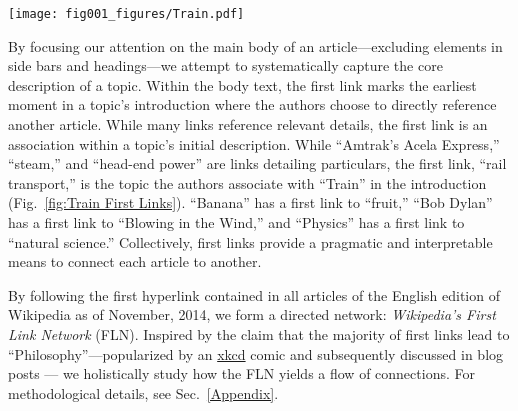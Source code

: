 \documentclass[pre,twocolumn,twoside,superscriptaddress,floatfix]{revtex4-1}
\begin{document}
\begin{figure*}[tp!]
  \texttt{[image: fig001\_figures/Train.pdf]}  
  \caption{
    \textbf{First Link Path For ``Train.''}
    We follow the first link  to another Wikipedia article
    in the main body of the article---the area
    inside the green rectangle, which excludes 
    side bar elements, the navigation bar and title; the first link is circled in red. 
    In this example, the first link to another Wikipedia article is ``Rail Transport.'' 
    We can again select the first link on the ``Rail Transport''
    article, repeating the process to 
    form a path of first links. After 11 links, we arrive at ``Philosophy.''
  }
  \label{fig:Train First Links}
\end{figure*}

By focusing our attention on the main body of an article---excluding
elements in side bars and headings---we 
attempt to systematically capture the core description of a topic.
Within the body text, the first link marks the earliest moment in a topic's introduction where the 
authors choose to directly reference another article. 
While many links reference relevant details, 
the first link is an association within a topic's initial 
description. While 
``Amtrak's Acela Express,'' ``steam,'' and ``head-end power'' 
are links detailing particulars, the first link, ``rail transport,''
is the topic the authors associate with ``Train'' in the introduction
(Fig.~\ref{fig:Train First Links}).
``Banana'' has a first link to ``fruit,'' ``Bob Dylan'' has a first link to 
``Blowing in the Wind,'' and ``Physics'' has a first link to ``natural science.''
Collectively, first links provide a pragmatic and interpretable 
means to connect each article to another.

By following the first hyperlink contained in all articles of the English edition of
Wikipedia as of November, 2014, we form a directed network:
{\it Wikipedia's First Link Network} (FLN).
Inspired by the claim that the majority of first links lead to
``Philosophy''---popularized by an 
\href{https://xkcd.com/903/}{xkcd}
comic and subsequently
discussed in blog posts 
\cite{xkcd, mat_blog, Ilmari_first_links, 
bob_west}
---
we holistically study how the FLN  yields a flow of connections.
For methodological details, see Sec.~\ref{Appendix}. 
\end{document}
